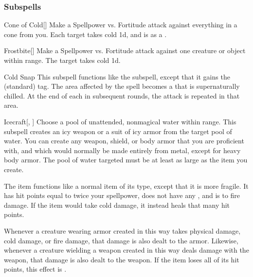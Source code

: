 \subsubsection{Subspells}


\begin{ability}[\nth{1}]{Cone of Cold}[]
Make a Spellpower vs. Fortitude attack against everything in a \areamed cone from you.
\hit Each target takes cold  \minus1d, and is  as a .
\end{ability}
\vspace{0.25em}


\begin{ability}[\nth{1}]{Frostbite}[]
Make a Spellpower vs. Fortitude attack against one creature or object within \rngmed range.
\hit The target takes cold  \plus1d.
\end{ability}
\vspace{0.25em}


\begin{ability}[\nth{2}]{Cold Snap}
This subspell functions like the  subspell, except that it gains the  (standard) tag.
The area affected by the spell becomes a  that is supernaturally chilled.
At the end of each  in subsequent rounds, the attack is repeated in that area.
\end{ability}
\vspace{0.25em}


\begin{ability}[\nth{2}]{Icecraft}[, ]
Choose a pool of unattended, nonmagical water within \rngclose range.
This subspell creates an icy weapon or a suit of icy armor from the target pool of water.
You can create any weapon, shield, or body armor that you are proficient with, and which would normally be made entirely from metal, except for heavy body armor.
The pool of water targeted must be at least as large as the item you create.

The item functions like a normal item of its type, except that it is more fragile.
It has hit points equal to twice your spellpower, does not have any , and is  to fire damage.
If the item would take cold damage, it instead heals that many hit points.

Whenever a creature wearing armor created in this way takes physical damage, cold damage, or fire damage, that damage is also dealt to the armor.
Likewise, whenever a creature wielding a weapon created in this way deals damage with the weapon, that damage is also dealt to the weapon.
If the item loses all of its hit points, this effect is .
\end{ability}
\vspace{0.25em}



